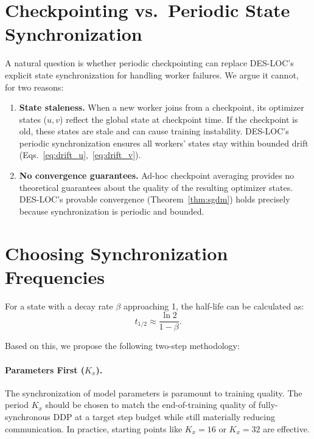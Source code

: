 \section{Checkpointing vs.\ Periodic State Synchronization}
\label{sec:checkpoint}

A natural question is whether periodic checkpointing can replace DES-LOC's explicit state synchronization for handling worker failures. We argue it cannot, for two reasons:

\begin{enumerate}
\item \textbf{State staleness.} When a new worker joins from a checkpoint, its optimizer states ($u, v$) reflect the global state at checkpoint time. If the checkpoint is old, these states are stale and can cause training instability. DES-LOC's periodic synchronization ensures all workers' states stay within bounded drift (Eqs.~\ref{eq:drift_u},~\ref{eq:drift_v}).

\item \textbf{No convergence guarantees.} Ad-hoc checkpoint averaging provides no theoretical guarantees about the quality of the resulting optimizer states. DES-LOC's provable convergence (Theorem~\ref{thm:sgdm}) holds precisely because synchronization is periodic and bounded.
\end{enumerate}

\section{Choosing Synchronization Frequencies}
\label{sec:choosing_freq}

For a state with a decay rate $\beta$ approaching 1, the half-life can be calculated as:
\begin{equation}
t_{1/2} \approx \frac{\ln 2}{1 - \beta}.
\end{equation}

Based on this, we propose the following two-step methodology:

\paragraph{Parameters First ($K_x$).} The synchronization of model parameters is paramount to training
quality. The period $K_x$ should be chosen to match the end-of-training quality of fully-synchronous DDP at a target step budget while still materially reducing communication. In
practice, starting points like $K_x = 16$ or $K_x = 32$ are effective.

